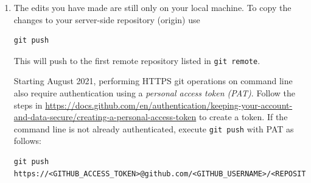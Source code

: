 \documentclass{article}
\begin{document}
\begin{enumerate}
\item The edits you have made are still only on your local machine. To copy the changes to your server-side repository (origin) use
\begin{lstlisting}
git push 
\end{lstlisting}
This will push to the first remote repository listed in \texttt{git remote}.

Starting August 2021, performing HTTPS git operations on command line also require authentication using a \emph{personal access token (PAT)}.
Follow the steps in \url{https://docs.github.com/en/authentication/keeping-your-account-and-data-secure/creating-a-personal-access-token} to create a token. If the command line is not already authenticated, execute \lstinline|git push| with PAT as follows:

\begin{lstlisting}[breaklines=true]
git push https://<GITHUB_ACCESS_TOKEN>@github.com/<GITHUB_USERNAME>/<REPOSITORY_NAME>.git
\end{lstlisting}


\end{enumerate}
\end{document}
